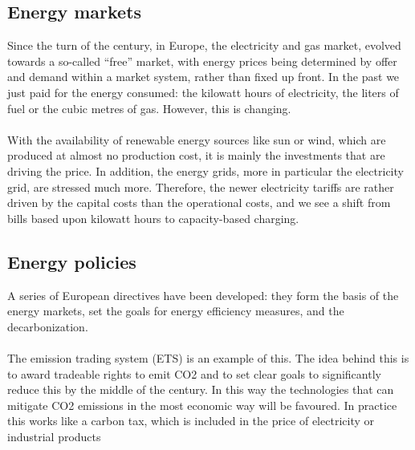 \documentclass[../summary.tex]{subfiles}
\begin{document}
	\subsection{Energy markets}
	
	 Since the turn of the century, in Europe, the electricity and gas market, evolved towards a so-called “free” market, with energy prices being determined by offer and demand within a market system, rather than fixed up front. In the past we just paid for the energy consumed: the kilowatt hours of electricity, the liters of fuel or the cubic metres of gas. However, this is changing.
	\\\\
	With the availability of renewable energy sources like sun or wind, which are produced at almost no production cost, it is mainly the investments that are driving the price. In addition, the energy grids, more in particular the electricity grid, are stressed much more. Therefore, the newer electricity tariffs are rather driven by the capital costs than the operational costs, and we see a shift from bills based upon kilowatt hours to capacity-based charging. 
	
	\subsection{Energy policies}
	
	A series of European directives have been developed: they form the basis of the energy markets, set the goals for energy efficiency measures, and the decarbonization. 
	\\\\
	The emission trading system (ETS) is an example of this. The idea behind this is to award tradeable rights to emit CO2 and to set clear goals to significantly reduce this by the middle of the century. In this way the technologies that can mitigate CO2 emissions in the most economic way will be favoured. In practice this works like a carbon tax, which is included in the price of electricity or industrial products
	
\end{document}
